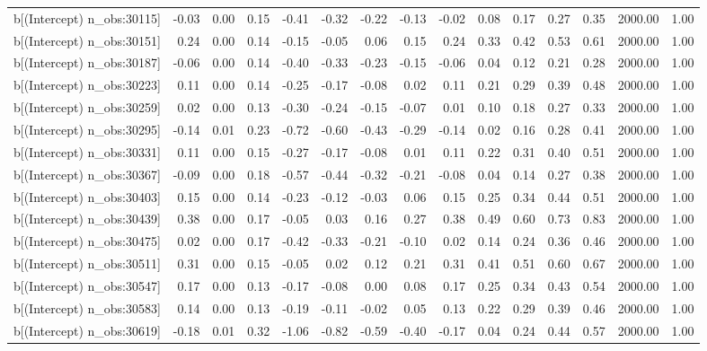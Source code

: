 \begin{table}[ht]
\begin{tabular}{rrrrrrrrrrrrrrr}
  b[(Intercept) n\_obs:30115] & -0.03 & 0.00 & 0.15 & -0.41 & -0.32 & -0.22 & -0.13 & -0.02 & 0.08 & 0.17 & 0.27 & 0.35 & 2000.00 & 1.00 \\ 
  b[(Intercept) n\_obs:30151] & 0.24 & 0.00 & 0.14 & -0.15 & -0.05 & 0.06 & 0.15 & 0.24 & 0.33 & 0.42 & 0.53 & 0.61 & 2000.00 & 1.00 \\ 
  b[(Intercept) n\_obs:30187] & -0.06 & 0.00 & 0.14 & -0.40 & -0.33 & -0.23 & -0.15 & -0.06 & 0.04 & 0.12 & 0.21 & 0.28 & 2000.00 & 1.00 \\ 
  b[(Intercept) n\_obs:30223] & 0.11 & 0.00 & 0.14 & -0.25 & -0.17 & -0.08 & 0.02 & 0.11 & 0.21 & 0.29 & 0.39 & 0.48 & 2000.00 & 1.00 \\ 
  b[(Intercept) n\_obs:30259] & 0.02 & 0.00 & 0.13 & -0.30 & -0.24 & -0.15 & -0.07 & 0.01 & 0.10 & 0.18 & 0.27 & 0.33 & 2000.00 & 1.00 \\ 
  b[(Intercept) n\_obs:30295] & -0.14 & 0.01 & 0.23 & -0.72 & -0.60 & -0.43 & -0.29 & -0.14 & 0.02 & 0.16 & 0.28 & 0.41 & 2000.00 & 1.00 \\ 
  b[(Intercept) n\_obs:30331] & 0.11 & 0.00 & 0.15 & -0.27 & -0.17 & -0.08 & 0.01 & 0.11 & 0.22 & 0.31 & 0.40 & 0.51 & 2000.00 & 1.00 \\ 
  b[(Intercept) n\_obs:30367] & -0.09 & 0.00 & 0.18 & -0.57 & -0.44 & -0.32 & -0.21 & -0.08 & 0.04 & 0.14 & 0.27 & 0.38 & 2000.00 & 1.00 \\ 
  b[(Intercept) n\_obs:30403] & 0.15 & 0.00 & 0.14 & -0.23 & -0.12 & -0.03 & 0.06 & 0.15 & 0.25 & 0.34 & 0.44 & 0.51 & 2000.00 & 1.00 \\ 
  b[(Intercept) n\_obs:30439] & 0.38 & 0.00 & 0.17 & -0.05 & 0.03 & 0.16 & 0.27 & 0.38 & 0.49 & 0.60 & 0.73 & 0.83 & 2000.00 & 1.00 \\ 
  b[(Intercept) n\_obs:30475] & 0.02 & 0.00 & 0.17 & -0.42 & -0.33 & -0.21 & -0.10 & 0.02 & 0.14 & 0.24 & 0.36 & 0.46 & 2000.00 & 1.00 \\ 
  b[(Intercept) n\_obs:30511] & 0.31 & 0.00 & 0.15 & -0.05 & 0.02 & 0.12 & 0.21 & 0.31 & 0.41 & 0.51 & 0.60 & 0.67 & 2000.00 & 1.00 \\ 
  b[(Intercept) n\_obs:30547] & 0.17 & 0.00 & 0.13 & -0.17 & -0.08 & 0.00 & 0.08 & 0.17 & 0.25 & 0.34 & 0.43 & 0.54 & 2000.00 & 1.00 \\ 
  b[(Intercept) n\_obs:30583] & 0.14 & 0.00 & 0.13 & -0.19 & -0.11 & -0.02 & 0.05 & 0.13 & 0.22 & 0.29 & 0.39 & 0.46 & 2000.00 & 1.00 \\ 
  b[(Intercept) n\_obs:30619] & -0.18 & 0.01 & 0.32 & -1.06 & -0.82 & -0.59 & -0.40 & -0.17 & 0.04 & 0.24 & 0.44 & 0.57 & 2000.00 & 1.00 \\ 

\end{tabular}
\end{table}
